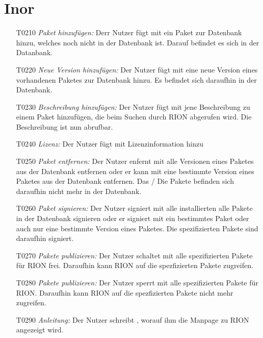 \section{Inor}

\begin{itemize}
	\item[T0210] \textit{Paket hinzufügen:} Derr Nutzer fügt mit  ein Paket zur Datenbank hinzu, welches noch nicht in der Datenbank ist. Darauf befindet es sich in der Datanbank.
	\item[T0220] \textit{Neue Version hinzufügen:} Der Nutzer fügt mit  eine neue Version eines vorhandenen Paketes zur Datenbank hinzu. Es befindet sich daraufhin in der Datenbank.
	\item[T0230] \textit{Beschreibung hinzufügen:} Der Nutzer fügt mit  jene Beschreibung zu einem Paket hinzufügen, die beim Suchen durch RION abgerufen wird. Die Beschreibung ist nun abrufbar.
	\item[T0240] \textit{Lizenz:} Der Nutzer fügt mit  Lizenzinformation hinzu
	\item[T0250] \textit{Paket entfernen:} Der Nutzer enfernt mit  alle Versionen eines Paketes aus der Datenbank entfernen oder er kann mit  eine bestimmte Version eines Paketes aus der Datenbank entfernen. Das / Die Pakete befinden sich daraufhin nicht mehr in der Datenbank.
	\item[T0260] \textit{Paket signieren:} Der Nutzer signiert mit  alle installierten alle Pakete in der Datenbank signieren oder er signiert mit  ein bestimmtes Paket oder auch nur eine bestimmte Version eines Paketes. Die spezifizierten Pakete sind daraufhin signiert.
	\item[T0270] \textit{Pakete publizieren:} Der Nutzer schaltet mit  alle spezifizierten Pakete für RION frei. Daraufhin kann RION auf die spezfizierten Pakete zugreifen.
	\item[T0280] \textit{Pakete publizieren:} Der Nutzer sperrt mit  alle spezifizierten Pakete für RION. Daraufhin kann RION auf die spezfizierten Pakete nicht mehr zugreifen.
	\item[T0290] \textit{Anleitung:} Der Nutzer schreibt , worauf ihm die Manpage zu RION angezeigt wird.
\end{itemize}
